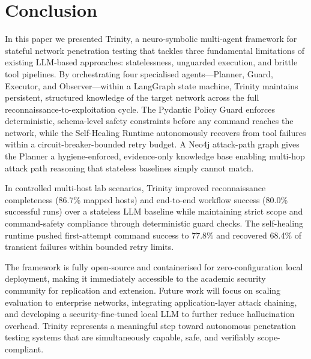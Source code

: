 \documentclass[conference]{IEEEtran}
\begin{document}
\section{Conclusion}
\label{sec:conclusion}

In this paper we presented Trinity, a neuro-symbolic multi-agent framework for stateful network penetration testing that tackles three fundamental limitations of existing LLM-based approaches: statelessness, unguarded execution, and brittle tool pipelines. By orchestrating four specialised agents---Planner, Guard, Executor, and Observer---within a LangGraph state machine, Trinity maintains persistent, structured knowledge of the target network across the full reconnaissance-to-exploitation cycle. The Pydantic Policy Guard enforces deterministic, schema-level safety constraints before any command reaches the network, while the Self-Healing Runtime autonomously recovers from tool failures within a circuit-breaker-bounded retry budget. A Neo4j attack-path graph gives the Planner a hygiene-enforced, evidence-only knowledge base enabling multi-hop attack path reasoning that stateless baselines simply cannot match.

In controlled multi-host lab scenarios, Trinity improved reconnaissance completeness (86.7\% mapped hosts) and end-to-end workflow success (80.0\% successful runs) over a stateless LLM baseline while maintaining strict scope and command-safety compliance through deterministic guard checks. The self-healing runtime pushed first-attempt command success to 77.8\% and recovered 68.4\% of transient failures within bounded retry limits.

The framework is fully open-source and containerised for zero-configuration local deployment, making it immediately accessible to the academic security community for replication and extension. Future work will focus on scaling evaluation to enterprise networks, integrating application-layer attack chaining, and developing a security-fine-tuned local LLM to further reduce hallucination overhead. Trinity represents a meaningful step toward autonomous penetration testing systems that are simultaneously capable, safe, and verifiably scope-compliant.
\end{document}
